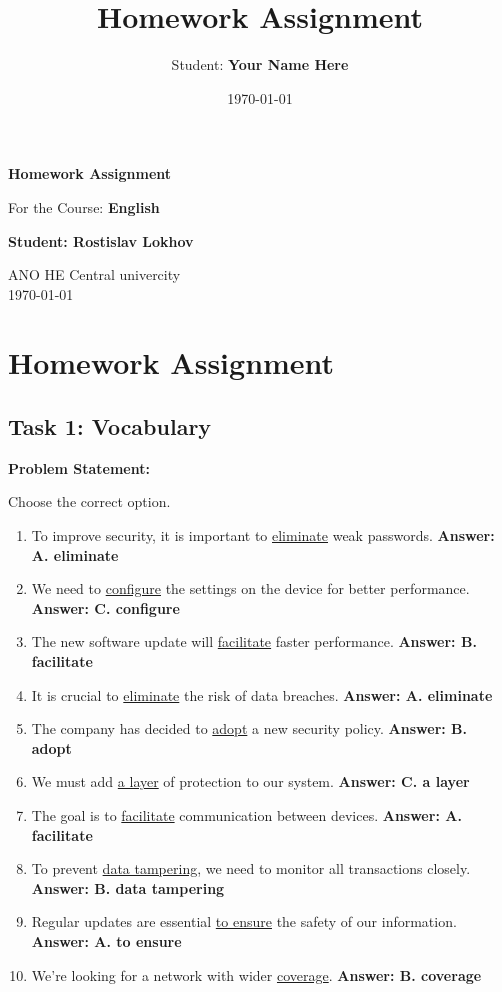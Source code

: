\documentclass[a4paper,12pt]{article}
\title{Homework Assignment}
\author{Student: \textbf{Your Name Here}}
\date{\today}
\begin{document}
\begin{titlepage}
    \centering
    \vspace*{1cm}

    \Huge
    \textbf{Homework Assignment}

    \vspace{0.5cm}
    \LARGE
    For the Course: \textbf{English}

    \vspace{1.5cm}

    \textbf{Student: Rostislav Lokhov}

    \vfill

    \Large
    ANO HE Central univercity\\
    \vspace{0.3cm}
    \today

\end{titlepage}

\tableofcontents
\newpage

\section{Homework Assignment}

\subsection{Task 1: Vocabulary}
\textbf{Problem Statement:}

Choose the correct option.

\begin{enumerate}
    \item To improve security, it is important to \underline{eliminate} weak passwords. \textbf{Answer: A. eliminate}
    \item We need to \underline{configure} the settings on the device for better performance. \textbf{Answer: C. configure}
    \item The new software update will \underline{facilitate} faster performance. \textbf{Answer: B. facilitate}
    \item It is crucial to \underline{eliminate} the risk of data breaches. \textbf{Answer: A. eliminate}
    \item The company has decided to \underline{adopt} a new security policy. \textbf{Answer: B. adopt}
    \item We must add \underline{a layer} of protection to our system. \textbf{Answer: C. a layer}
    \item The goal is to \underline{facilitate} communication between devices. \textbf{Answer: A. facilitate}
    \item To prevent \underline{data tampering}, we need to monitor all transactions closely. \textbf{Answer: B. data tampering}
    \item Regular updates are essential \underline{to ensure} the safety of our information. \textbf{Answer: A. to ensure}
    \item We’re looking for a network with wider \underline{coverage}. \textbf{Answer: B. coverage}
\end{enumerate}
\end{document}
